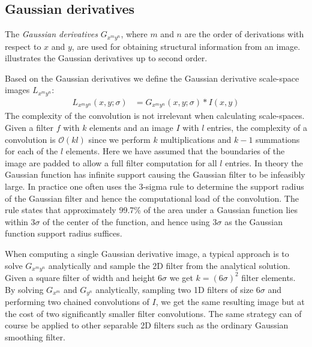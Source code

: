 \documentclass[thesis.tex]{subfiles}
\begin{document}
\subsection{Gaussian derivatives}
\label{sec:gaussianDerivatives}

The \emph{Gaussian derivatives} $G_{x^m y^n}$, where $m$ and $n$ are the order of derivations with respect to $x$ and $y$, are used for obtaining structural information from an image.  illustrates the Gaussian derivatives up to second order.

Based on the Gaussian derivatives we define the Gaussian derivative scale-space images $L_{x^m y^n}$:
\begin{align}
	L_{x^m y^n}(x,y;\sigma) &= G_{x^m y^n}(x,y;\sigma) \ast I(x,y)
\end{align}
%
The complexity of the convolution is not irrelevant when calculating scale-spaces. Given a filter $f$ with $k$ elements and an image $I$ with $l$ entries, the complexity of a convolution is $\mathcal{O}(k l)$ since we perform $k$ multiplications and $k-1$ summations for each of the $l$ elements. Here we have assumed that the boundaries of the image are padded to allow a full filter computation for all $l$ entries.
In theory the Gaussian function has infinite support causing the Gaussian filter to be infeasibly large. In practice one often uses the 3-sigma rule to determine the support radius of the Gaussian filter and hence the computational load of the convolution. The rule states that approximately 99.7\% of the area under a Gaussian function lies within 3$\sigma$ of the center of the function, and hence using $3\sigma$ as the Gaussian function support radius suffices.

When computing a single Gaussian derivative image, a typical approach is to solve $G_{x^m y^n}$ analytically and sample the 2D filter from the analytical solution. Given a square filter of width and height $6\sigma$ we get $k=(6\sigma)^2$ filter elements. By solving $G_{x^m}$ and $G_{y^n}$ analytically, sampling two 1D filters of size $6\sigma$ and performing two chained convolutions of $I$, we get the same resulting image but at the cost of two significantly smaller filter convolutions. The same strategy can of course be applied to other separable 2D filters such as the ordinary Gaussian smoothing filter.
\end{document}
